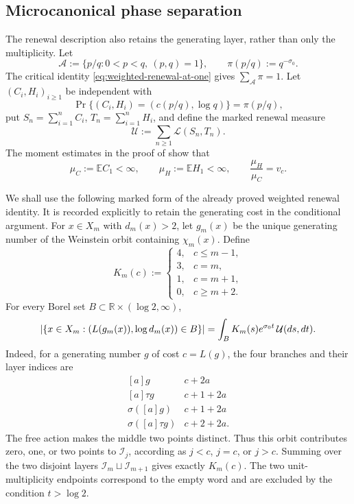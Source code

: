 \subsection{Microcanonical phase separation}

The renewal description also retains the generating layer, rather than only
the multiplicity.  Let
\[
 \mathcal A:=\{p/q:0<p<q,\ (p,q)=1\},
 \qquad \pi(p/q):=q^{-\sigma _0}.
\]
The critical identity \eqref{eq:weighted-renewal-at-one} gives
\(\sum_{\mathcal A}\pi=1\).  Let \((C_i,H_i)_{i\ge1}\) be independent with
\[
 \Pr\{(C_i,H_i)=(c(p/q),\log q)\}=\pi(p/q),
\]
put \(S_n=\sum_{i=1}^nC_i\), \(T_n=\sum_{i=1}^nH_i\), and define the marked
renewal measure
\[
 \mathcal U:=\sum_{n\ge1}\mathcal L(S_n,T_n).
\]
The moment estimates in the proof of  show that
\[
 \mu_C:=\mathbb E C_1<\infty,
 \qquad \mu_H:=\mathbb E H_1<\infty,
 \qquad \frac{\mu_H}{\mu_C}=v_c.
\]

We shall use the following marked form of the already proved weighted renewal
identity.  It is recorded explicitly to retain the generating cost in the
conditional argument.  For $x\in X_m$ with \(d_m(x)>2\), let \(g_m(x)\) be
the unique generating number of the Weinstein orbit containing \(\chi_m(x)\).
Define
\[
 K_m(c):=
 \begin{cases}
  4,&c\le m-1,\\
  3,&c=m,\\
  1,&c=m+1,\\
  0,&c\ge m+2.
 \end{cases}
\]
For every Borel set \(B\subset\mathbb R\times(\log2,\infty)\),
\begin{equation}
 \lvert \{x\in X_m:(L(g_m(x)),\log d_m(x))\in B\} \rvert
 =\int_B K_m(s)e^{\sigma_0t}\,\mathcal U(ds,dt).
 \label{eq:marked-microcanonical-count}
\end{equation}
Indeed, for a generating number \(g\) of cost \(c=L(g)\), the four branches
and their layer indices are
\[
 \begin{array}{c|c}
 {}[a]g&c+2a\\
 {}[a]\tau g&c+1+2a\\
 \sigma([a]g)&c+1+2a\\
 \sigma([a]\tau g)&c+2+2a.
 \end{array}
\]
The free action makes the middle two points distinct.  Thus this orbit
contributes zero, one, or two points to \(\mathcal I_j\), according as
\(j<c\), \(j=c\), or \(j>c\).  Summing over the two disjoint layers
\(\mathcal I_m\sqcup\mathcal I_{m+1}\) gives exactly \(K_m(c)\).  The two
unit-multiplicity endpoints correspond to the empty word and are excluded by
the condition \(t>\log2\).

